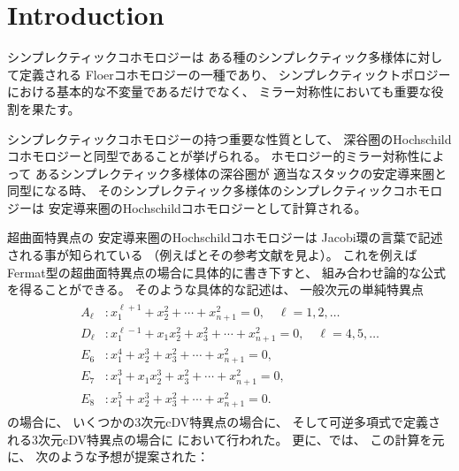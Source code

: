 %

\chapter{Introduction}

シンプレクティックコホモロジーは
ある種のシンプレクティック多様体に対して定義される
Floerコホモロジーの一種であり、
シンプレクティックトポロジーにおける基本的な不変量であるだけでなく、
ミラー対称性においても重要な役割を果たす。

シンプレクティックコホモロジーの持つ重要な性質として、
深谷圏のHochschildコホモロジーと同型であることが挙げられる。
ホモロジー的ミラー対称性によって
あるシンプレクティック多様体の深谷圏が
適当なスタックの安定導来圏と同型になる時、
そのシンプレクティック多様体のシンプレクティックコホモロジーは
安定導来圏のHochschildコホモロジーとして計算される。

超曲面特異点の
安定導来圏のHochschildコホモロジーは
Jacobi環の言葉で記述される事が知られている
（例えば\cite[Theorem 3.1]{MR4442683}とその参考文献を見よ）。
これを例えばFermat型の超曲面特異点の場合に具体的に書き下すと、
組み合わせ論的な公式を得ることができる。
そのような具体的な記述は、
一般次元の単純特異点
\begin{align} \label{eq:simple}
\begin{split}
 A_\ell &\colon x_1^{\ell+1} + x_2^2 + \cdots + x_{n+1}^2 = 0, \quad \ell = 1, 2, \ldots \\
 D_\ell &\colon x_1^{\ell-1} + x_1 x_2^2 + x_3^2+ \cdots + x_{n+1}^2 = 0, \quad \ell = 4, 5, \ldots \\
 E_6 &\colon x_1^4 + x_2^3 + x_3^2 + \cdots + x_{n+1}^2 = 0, \\
 E_7 &\colon x_1^3 + x_1 x_2^3 + x_3^2 + \cdots + x_{n+1}^2 = 0, \\
 E_8 &\colon x_1^5 + x_2^3 + x_3^2 + \cdots + x_{n+1}^2 = 0.
\end{split}
\end{align}
の場合に\cite{MR4371540}、
いくつかの3次元cDV特異点の場合に\cite{MR4648096}、
そして可逆多項式で定義される3次元cDV特異点の場合に\cite{2404.17301v1}
において行われた。
更に、\cite{MR4648096}では、
この計算を元に、
次のような予想が提案された：

